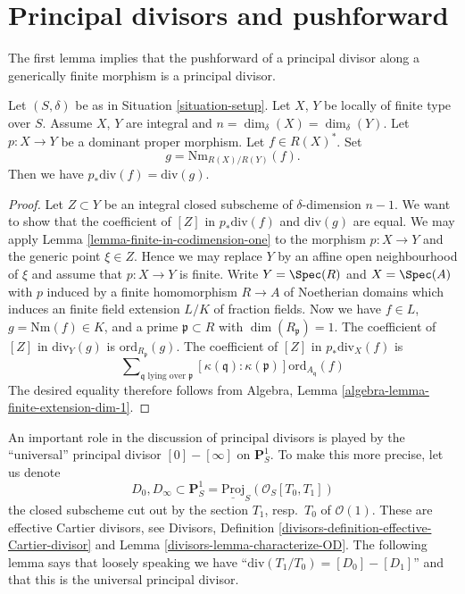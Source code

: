 \section{Principal divisors and pushforward}
\label{section-two-fun}

\noindent
The first lemma implies that the pushforward of a principal
divisor along a generically finite morphism is a principal divisor.

\begin{lemma}
\label{lemma-proper-pushforward-alteration}
Let $(S, \delta)$ be as in Situation \ref{situation-setup}.
Let $X$, $Y$ be locally of finite type over $S$. Assume $X$, $Y$
are integral and $n = \dim_\delta(X) = \dim_\delta(Y)$.
Let $p : X \to Y$ be a dominant proper morphism.
Let $f \in R(X)^*$. Set
$$
g = \text{Nm}_{R(X)/R(Y)}(f).
$$
Then we have
$p_*\text{div}(f) = \text{div}(g)$.
\end{lemma}

\begin{proof}
Let $Z \subset Y$ be an integral closed subscheme of $\delta$-dimension
$n - 1$. We want to show that the coefficient of $[Z]$ in
$p_*\text{div}(f)$ and $\text{div}(g)$ are equal. We may apply
Lemma \ref{lemma-finite-in-codimension-one}
to the morphism $p : X \to Y$ and the generic point $\xi \in Z$.
Hence we may replace $Y$ by an
affine open neighbourhood of $\xi$ and assume that $p : X \to Y$ is finite.
Write $Y = \Spec(R)$ and $X = \Spec(A)$ with $p$ induced
by a finite homomorphism $R \to A$ of Noetherian domains which induces
an finite field extension $L/K$ of fraction fields.
Now we have $f \in L$, $g = \text{Nm}(f) \in K$,
and a prime $\mathfrak p \subset R$ with $\dim(R_{\mathfrak p}) = 1$.
The coefficient of $[Z]$ in $\text{div}_Y(g)$ is
$\text{ord}_{R_\mathfrak p}(g)$.
The coefficient of $[Z]$ in $p_*\text{div}_X(f)$ is
$$
\sum\nolimits_{\mathfrak q\text{ lying over }\mathfrak p}
[\kappa(\mathfrak q) : \kappa(\mathfrak p)]
\text{ord}_{A_{\mathfrak q}}(f)
$$
The desired equality therefore follows from
Algebra, Lemma \ref{algebra-lemma-finite-extension-dim-1}.
\end{proof}

\noindent
An important role in the discussion of principal divisors
is played by the ``universal'' principal divisor $[0] - [\infty]$
on $\mathbf{P}^1_S$. To make this more precise, let us denote
\begin{equation}
\label{equation-zero-infty}
D_0, D_\infty \subset
\mathbf{P}^1_S = \underline{\text{Proj}}_S(\mathcal{O}_S[T_0, T_1])
\end{equation}
the closed subscheme cut out by the section $T_1$, resp.\ $T_0$
of $\mathcal{O}(1)$. These are effective Cartier divisors, see
Divisors, Definition \ref{divisors-definition-effective-Cartier-divisor}
and Lemma \ref{divisors-lemma-characterize-OD}.
The following lemma says that loosely speaking we have
``$\text{div}(T_1/T_0) = [D_0] - [D_1]$'' and that this is the
universal principal divisor.

